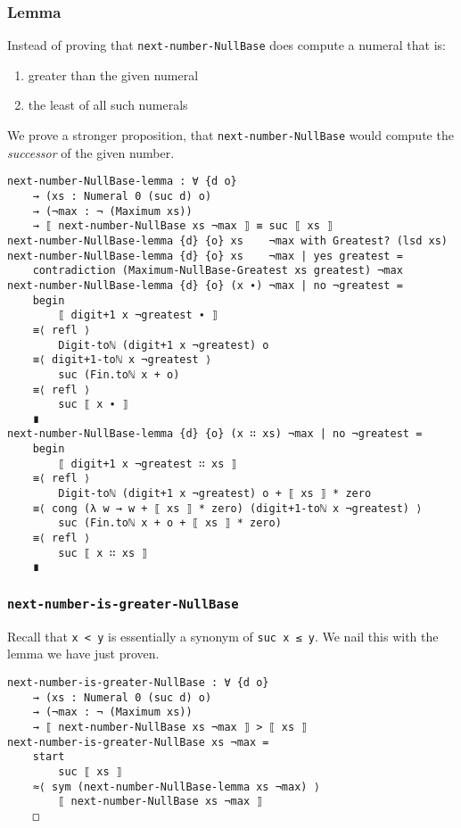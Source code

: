 \documentclass[\main/thesis.tex]{subfiles}
\begin{document}
\subsubsection{Lemma}

Instead of proving that {\lstinline|next-number-NullBase|} does compute a numeral
that is:
\begin{enumerate}
    \item greater than the given numeral
    \item the least of all such numerals
\end{enumerate}

We prove a stronger proposition, that {\lstinline|next-number-NullBase|} would
compute the \textit{successor} of the given number.

\begin{lstlisting}[basicstyle=\ttfamily\scriptsize]
next-number-NullBase-lemma : ∀ {d o}
    → (xs : Numeral 0 (suc d) o)
    → (¬max : ¬ (Maximum xs))
    → ⟦ next-number-NullBase xs ¬max ⟧ ≡ suc ⟦ xs ⟧
next-number-NullBase-lemma {d} {o} xs    ¬max with Greatest? (lsd xs)
next-number-NullBase-lemma {d} {o} xs    ¬max | yes greatest =
    contradiction (Maximum-NullBase-Greatest xs greatest) ¬max
next-number-NullBase-lemma {d} {o} (x ∙) ¬max | no ¬greatest =
    begin
        ⟦ digit+1 x ¬greatest ∙ ⟧
    ≡⟨ refl ⟩
        Digit-toℕ (digit+1 x ¬greatest) o
    ≡⟨ digit+1-toℕ x ¬greatest ⟩
        suc (Fin.toℕ x + o)
    ≡⟨ refl ⟩
        suc ⟦ x ∙ ⟧
    ∎
next-number-NullBase-lemma {d} {o} (x ∷ xs) ¬max | no ¬greatest =
    begin
        ⟦ digit+1 x ¬greatest ∷ xs ⟧
    ≡⟨ refl ⟩
        Digit-toℕ (digit+1 x ¬greatest) o + ⟦ xs ⟧ * zero
    ≡⟨ cong (λ w → w + ⟦ xs ⟧ * zero) (digit+1-toℕ x ¬greatest) ⟩
        suc (Fin.toℕ x + o + ⟦ xs ⟧ * zero)
    ≡⟨ refl ⟩
        suc ⟦ x ∷ xs ⟧
    ∎
\end{lstlisting}

\subsubsection{{\lstinline|next-number-is-greater-NullBase|}}

Recall that {\lstinline|x < y|} is essentially a synonym of {\lstinline|suc x ≤ y|}.
We nail this with the lemma we have just proven.

\begin{lstlisting}
next-number-is-greater-NullBase : ∀ {d o}
    → (xs : Numeral 0 (suc d) o)
    → (¬max : ¬ (Maximum xs))
    → ⟦ next-number-NullBase xs ¬max ⟧ > ⟦ xs ⟧
next-number-is-greater-NullBase xs ¬max =
    start
        suc ⟦ xs ⟧
    ≈⟨ sym (next-number-NullBase-lemma xs ¬max) ⟩
        ⟦ next-number-NullBase xs ¬max ⟧
    □
\end{lstlisting}
\end{document}
